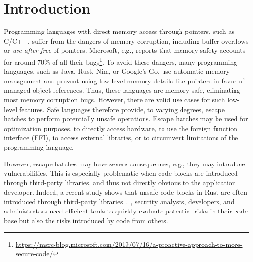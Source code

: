 \section{Introduction}
\label{sec:intro}

Programming languages with direct memory access through pointers, such as C/C++, suffer from the dangers of memory corruption, including buffer overflows \cite{alnaeli2017, larochelle2001} or \textit{use-after-free} of pointers.
Microsoft, e.g., reports that memory safety accounts for around 70\% of all their bugs\footnote{\url{https://msrc-blog.microsoft.com/2019/07/16/a-proactive-approach-to-more-secure-code/}}. 
To avoid these dangers, many programming languages, such as Java, Rust, Nim, or Google's Go, use automatic memory management and prevent using low-level memory details like pointers in favor of managed object references.
Thus, these languages are memory safe, eliminating most memory corruption bugs. 
However, there are valid use cases for such low-level features.
%
%
%
Safe languages therefore provide, to varying degrees, escape hatches to perform potentially unsafe operations.
Escape hatches may be used for optimization purposes, to directly access hardware, to use the foreign function interface (FFI), to access external libraries, or to circumvent limitations of the programming language. 

However, escape hatches may have severe consequences, e.g., they may introduce vulnerabilities.
This is especially problematic when \unsafe{} code blocks are introduced through third-party libraries, and thus  not directly obvious to the application developer. 
Indeed, a recent study shows that unsafe code blocks in Rust are often introduced through third-party libraries~\cite{evans2020}. 
, security analysts, developers, and administrators need efficient tools to quickly evaluate potential risks in their code base but also the risks introduced by code from others.

